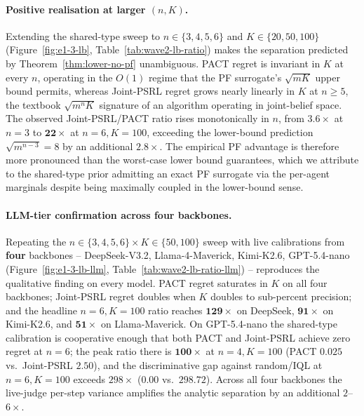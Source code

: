 \paragraph{Positive realisation at larger $(n, K)$.} Extending the shared-type sweep to $n\!\in\!\{3,4,5,6\}$ and $K\!\in\!\{20,50,100\}$ (Figure~\ref{fig:e1-3-lb}, Table~\ref{tab:wave2-lb-ratio}) makes the separation predicted by Theorem~\ref{thm:lower-no-pf} unambiguous. PACT regret is invariant in $K$ at every $n$, operating in the $O(1)$ regime that the PF surrogate's $\sqrt{m K}$ upper bound permits, whereas Joint-PSRL regret grows nearly linearly in $K$ at $n\!\geq\!5$, the textbook $\sqrt{m^n K}$ signature of an algorithm operating in joint-belief space. The observed Joint-PSRL/PACT ratio rises monotonically in $n$, from $3.6\!\times$ at $n{=}3$ to $\mathbf{22\!\times}$ at $n{=}6, K{=}100$, exceeding the lower-bound prediction $\sqrt{m^{n-3}}\!=\!8$ by an additional $2.8\!\times$. The empirical PF advantage is therefore more pronounced than the worst-case lower bound guarantees, which we attribute to the shared-type prior admitting an exact PF surrogate via the per-agent marginals despite being maximally coupled in the lower-bound sense.

\paragraph{LLM-tier confirmation across four backbones.} Repeating the $n\!\in\!\{3,4,5,6\}\times K\!\in\!\{50,100\}$ sweep with live calibrations from \textbf{four} backbones -- DeepSeek-V3.2, Llama-4-Maverick, Kimi-K2.6, GPT-5.4-nano (Figure~\ref{fig:e1-3-lb-llm}, Table~\ref{tab:wave2-lb-ratio-llm}) -- reproduces the qualitative finding on every model. PACT regret saturates in $K$ on all four backbones; Joint-PSRL regret doubles when $K$ doubles to sub-percent precision; and the headline $n{=}6, K{=}100$ ratio reaches $\mathbf{129\times}$ on DeepSeek, $\mathbf{91\times}$ on Kimi-K2.6, and $\mathbf{51\times}$ on Llama-Maverick. On GPT-5.4-nano the shared-type calibration is cooperative enough that both PACT and Joint-PSRL achieve zero regret at $n{=}6$; the peak ratio there is $\mathbf{100\times}$ at $n{=}4, K{=}100$ (PACT $0.025$ vs.\ Joint-PSRL $2.50$), and the discriminative gap against random/IQL at $n{=}6, K{=}100$ exceeds $298\times$ ($0.00$ vs.\ $298.72$). Across all four backbones the live-judge per-step variance amplifies the analytic separation by an additional $2$--$6\times$.


